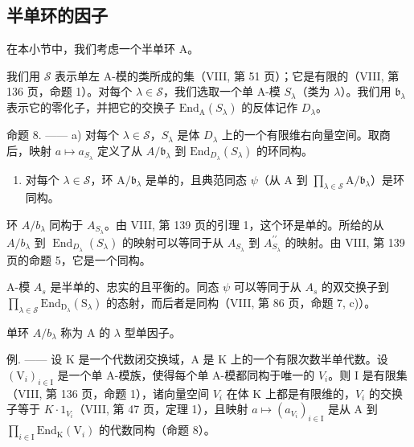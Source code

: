 \subsection{半单环的因子}

在本小节中，我们考虑一个半单环 A。

我们用 \(\mathcal{S}\) 表示单左 A-模的类所成的集（VIII, 第 51 页）；它是有限的（VIII, 第 136 页，命题 1）。对每个 \(\lambda \in \mathcal{S}\)，我们选取一个单 A-模 \(S_{\lambda}\)（类为 \(\lambda\)）。我们用 \(\mathfrak{b}_{\lambda}\) 表示它的零化子，并把它的交换子 \(\mathrm{End}_{\mathrm{A}}(S_{\lambda})\) 的反体记作 \(D_{\lambda}\)。

命题 8. —— a) 对每个 \(\lambda \in \mathcal{S}\)，\(S_{\lambda}\) 是体 \(D_{\lambda}\) 上的一个有限维右向量空间。取商后，映射 \(a \mapsto a_{S_{\lambda}}\) 定义了从 \(A / \mathfrak{b}_{\lambda}\) 到 \(\mathrm{End}_{D_{\lambda}}(S_{\lambda})\) 的环同构。

\begin{enumerate}
\def\labelenumi{\alph{enumi})}
\setcounter{enumi}{1}
\tightlist
\item
  对每个 \(\lambda \in \mathcal{S}\)，环 \(\mathrm{A} / \mathfrak{b}_{\lambda}\) 是单的，且典范同态 \(\psi\)（从 \(\mathrm{A}\) 到 \(\prod_{\lambda \in \mathcal{S}}\mathrm{A} / \mathfrak{b}_{\lambda}\)）是环同构。
\end{enumerate}

环 \(A/b_{\lambda}\) 同构于 \(A_{S_{\lambda}}\)。由 VIII, 第 139 页的引理 1，这个环是单的。所给的从 \(A/b_{\lambda}\) 到 \(\operatorname{End}_{D_{\lambda}}(S_{\lambda})\) 的映射可以等同于从 \(A_{S_{\lambda}}\) 到 \(A_{S_{\lambda}}^{\prime\prime}\) 的映射。由 VIII, 第 139 页的命题 5，它是一个同构。

A-模 \(A_{s}\) 是半单的、忠实的且平衡的。同态 \(\psi\) 可以等同于从 \(A_{s}\) 的双交换子到 \(\prod_{\lambda\in\mathcal{S}}\mathrm{End}_{\mathrm{D}_{\lambda}}(\mathrm{S}_{\lambda})\) 的态射，而后者是同构（VIII, 第 86 页，命题 7, c)）。

单环 \(A/b_{\lambda}\) 称为 A 的 \(\lambda\) 型单因子。

例. —— 设 K 是一个代数闭交换域，A 是 K 上的一个有限次数半单代数。设 \((\mathrm{V}_{i})_{i\in\mathrm{I}}\) 是一个单 A-模族，使得每个单 A-模都同构于唯一的 \(V_{i}\)。则 I 是有限集（VIII, 第 136 页，命题 1），诸向量空间 \(V_{i}\) 在体 K 上都是有限维的，\(V_{i}\) 的交换子等于 \(K\cdot1_{V_{i}}\)（VIII, 第 47 页，定理 1），且映射 \(a\mapsto(a_{V_{i}})_{i\in\mathrm{I}}\) 是从 A 到 \(\prod_{i\in\mathrm{I}}\mathrm{End}_{\mathrm{K}}(\mathrm{V}_{i})\) 的代数同构（命题 8）。

